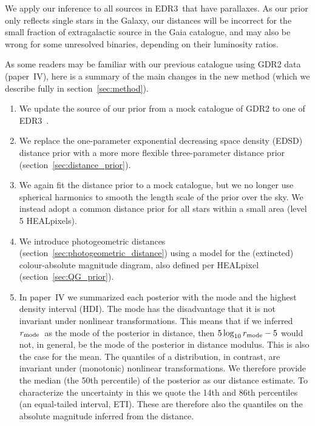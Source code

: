 \documentclass[twocolumn]{aastex62}
\providecommand{\logten}{\ensuremath{\log_{\rm 10}}}
\providecommand{\logten}{\ensuremath{\log_{\rm 10}}}
\providecommand{\gdr}[1]{GDR{#1}}
\providecommand{\release}{EDR3}
\providecommand{\dist}{\ensuremath{r}}
\providecommand{\rmode}{\ensuremath{\dist_{\rm mode}}}
\begin{document}
We apply our inference to all sources in \release\ that have parallaxes. As our prior only reflects single stars in the Galaxy, our distances will be incorrect for the small fraction of extragalactic source in the Gaia catalogue, and may also be wrong for some unresolved binaries, depending on their luminosity ratios.

As some readers may be familiar with our previous catalogue using \gdr{2} data (paper~IV), here is a summary
of the main changes in the new method (which we describe fully in  section~\ref{sec:method}).
\begin{enumerate}
\item We update the source of our prior from a mock catalogue of \gdr{2} \citep{2018PASP..130g4101R} to one of \release\ \citep{2020PASP..132g4501R}.
\item We replace the one-parameter exponential decreasing space
  density (EDSD) distance prior with a more more flexible three-parameter distance prior (section~\ref{sec:distance_prior}).
\item  We again fit the distance prior to a mock catalogue, but 
we no longer use spherical harmonics to smooth the length scale
  of the prior over the sky. We instead adopt a common
  distance prior for all stars within a small area (level 5 HEALpixels).
\item We introduce photogeometric distances (section~\ref{sec:photogeometric_distance}) using a model for the (extincted) colour-absolute magnitude diagram, also defined per HEALpixel (section~\ref{sec:QG_prior}).
\item In paper~IV we summarized each posterior with the mode and the
  highest density interval (HDI). 
  The mode has the disadvantage that it is not invariant
  under nonlinear transformations. This means that 
  if we inferred \rmode\ as the mode of the posterior in distance, then $5\logten\rmode-5$ would not, in general, be the mode of the
  posterior in distance modulus. This is also the case for the mean.
  The quantiles of a distribution, in contrast, are invariant under (monotonic) nonlinear transformations.
   We therefore provide the median (the 50th
  percentile) of the posterior as our distance
  estimate. To characterize the uncertainty in this we quote the 14th and 86th percentiles (an equal-tailed interval, ETI). These are therefore also the quantiles on the absolute magnitude inferred from the distance.
\end{enumerate}
\end{document}
